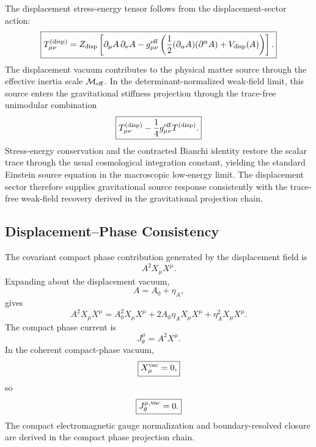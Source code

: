 \documentclass[11pt]{article}
\begin{document}
The displacement stress-energy tensor follows from the displacement-sector
action:
\begin{equation}
\boxed{
T_{\mu\nu}^{({\rm disp})}
=
Z_{\rm disp}
\left[
\partial_\mu A\,\partial_\nu A
-
g_{\mu\nu}^{\rm eff}
\left(
\frac12
(\partial_\alpha A)(\partial^\alpha A)
+
V_{\rm disp}(A)
\right)
\right].
}
\end{equation}
The displacement vacuum contributes to the physical matter source through the
effective inertia scale \(\mathcal M_{\rm eff}\). In the determinant-normalized
weak-field limit, this source enters the gravitational stiffness projection
through the trace-free unimodular combination
\begin{equation}
\boxed{
T_{\mu\nu}^{({\rm disp})}
-
\frac14
g_{\mu\nu}^{\rm eff}
T^{({\rm disp})}.
}
\end{equation}
Stress-energy conservation and the contracted Bianchi identity restore the scalar
trace through the usual cosmological integration constant, yielding the standard
Einstein source equation in the macroscopic low-energy limit. The displacement
sector therefore supplies gravitational source response consistently with the
trace-free weak-field recovery derived in the gravitational projection chain.

\subsection{Displacement--Phase Consistency}

The covariant compact phase contribution generated by the displacement field is
\begin{equation}
\boxed{
A^2X_\mu X^\mu.
}
\end{equation}
Expanding about the displacement vacuum,
\begin{equation}
A=A_0+\eta_A,
\end{equation}
gives
\begin{equation}
\boxed{
A^2X_\mu X^\mu
=
A_0^2X_\mu X^\mu
+
2A_0\eta_A X_\mu X^\mu
+
\eta_A^2X_\mu X^\mu.
}
\end{equation}
The compact phase current is
\begin{equation}
\boxed{
J_\theta^\mu
=
A^2X^\mu.
}
\end{equation}
In the coherent compact-phase vacuum,
\begin{equation}
\boxed{
X_\mu^{\rm vac}=0,
}
\end{equation}
so
\begin{equation}
\boxed{
J_\theta^{\mu,{\rm vac}}=0.
}
\end{equation}
The compact electromagnetic gauge normalization and boundary-resolved closure
are derived in the compact phase projection chain.
\end{document}
